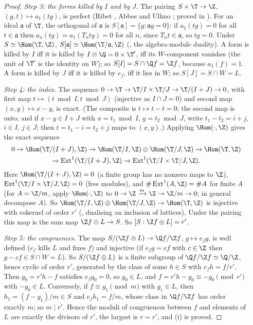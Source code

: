 \begin{proof}
\emph{Step 3: the forms killed by $I$ and by $J$.} The pairing $S\times\T\to\Z$, $(g,t)\mapsto a_1(tg)$, is perfect (Ribet \cite[Theorem 2.2]{Ribet83}, Abbes and Ullmo
\cite[Lemma 2.1]{AU96}; proved in ). For an ideal $\mathfrak a$ of $\T$, the orthogonal of $\mathfrak a$ is $S[\mathfrak a]=\{g:\mathfrak ag=0\}$: if $a_1(tg)=0$ for all $t\in\mathfrak a$ then
$a_n(tg)=a_1(T_ntg)=0$ for all $n$, since $T_nt\in\mathfrak a$, so $tg=0$. Under $S\simeq\Hom(\T,\Z)$, $S[\mathfrak a]\simeq\Hom(\T/\mathfrak a,\Z)$ (, the algebra-module duality). A form
is killed by $I$ iff it is killed by $I\otimes\Q=0\times\T'$, iff its $W$-component vanishes (the unit of $\T'$ is the identity on $W$); so $S[I]=S\cap\Q f=\Z f$, because $a_1(f)=1$.
A form is killed by $J$ iff it is killed by $e_f$, iff it lies in $W$; so $S[J]=S\cap W=L$.

\emph{Step 4: the index.} The sequence $0\to\T\to\T/I\times\T/J\to\T/(I+J)\to0$, with first map $t\mapsto(t\bmod I,t\bmod J)$ (injective as $I\cap J=0$) and second map $(x,y)\mapsto x-y$, is
exact. (The composite is $t\mapsto t-t=0$; the second map is onto; and if $x-y\in I+J$ with $x=t_1\bmod I$, $y=t_2\bmod J$, write $t_1-t_2=i+j$, $i\in I$, $j\in J$; then
$t=t_1-i=t_2+j$ maps to $(x,y)$.) Applying $\Hom(\cdot,\Z)$ gives the exact sequence
\[
\begin{gathered}
0\to\Hom(\T/(I+J),\Z)\to\Hom(\T/I,\Z)\oplus\Hom(\T/J,\Z)\to\Hom(\T,\Z)\\
\to\operatorname{Ext}^1(\T/(I+J),\Z)\to\operatorname{Ext}^1(\T/I\times\T/J,\Z).
\end{gathered}
\]
Here $\Hom(\T/(I+J),\Z)=0$ (a finite group has no nonzero maps to $\Z$), $\operatorname{Ext}^1(\T/I\times\T/J,\Z)=0$ (free modules), and $\#\operatorname{Ext}^1(A,\Z)=\#A$ for finite $A$ (for $A=\Z/m$,
apply $\Hom(\cdot,\Z)$ to $0\to\Z\xrightarrow{m}\Z\to\Z/m\to0$; in general decompose $A$). So $\Hom(\T/I,\Z)\oplus\Hom(\T/J,\Z)\to\Hom(\T,\Z)$ is injective with cokernel of order $r'$ (, dualising an inclusion of lattices). Under the
pairing this map is the sum map $\Z f\oplus L\to S$. So $[S:\Z f\oplus L]=r'$.

\emph{Step 5: the congruences.} The map $S/(\Z f\oplus L)\to\Q f/\Z f$, $g\mapsto e_fg$, is well defined ($e_f$ kills $L$ and fixes $f$) and injective (if $e_fg=cf$ with $c\in\Z$ then
$g-cf\in S\cap W=L$). So $S/(\Z f\oplus L)$ is a finite subgroup of $\Q f/\Z f\simeq\Q/\Z$, hence cyclic of order $r'$, generated by the class of some $h\in S$ with $e_fh=f/r'$. Then
$g_0=r'h-f$ satisfies $e_fg_0=0$, so $g_0\in L$, and $f=r'h-g_0\equiv-g_0\pmod{r'}$ with $-g_0\in L$. Conversely, if $f\equiv g_1\pmod m$ with $g_1\in L$, then $h_1=(f-g_1)/m\in S$
and $e_fh_1=f/m$, whose class in $\Q f/\Z f$ has order exactly $m$; so $m\mid r'$. Hence the moduli of congruences between $f$ and elements of $L$ are exactly the
divisors of $r'$, the largest is $r=r'$, and (i) is proved.


\end{proof}
